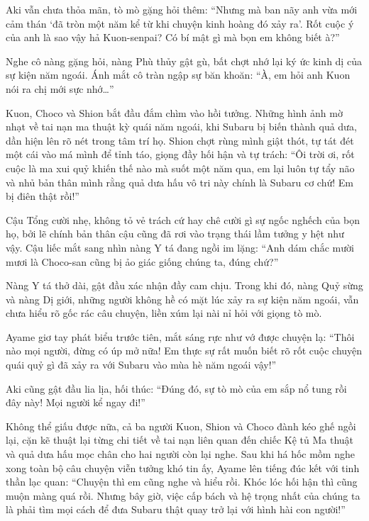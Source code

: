 \documentclass[../main.tex]{subfiles}
\begin{document}
Aki vẫn chưa thỏa mãn, tò mò gặng hỏi thêm:
``Nhưng mà ban nãy anh vừa mới cảm thán `đã tròn một năm kể từ khi chuyện kinh hoàng đó xảy ra'. Rốt cuộc ý của anh là sao vậy hả Kuon-senpai? Có bí mật gì mà bọn em không biết à?''

Nghe cô nàng gặng hỏi, nàng Phù thủy gật gù, bất chợt nhớ lại ký ức kinh dị của sự kiện năm ngoái. Ánh mắt cô tràn ngập sự băn khoăn:
``À, em hỏi anh Kuon nói ra chị mới sực nhớ\dots''

Kuon, Choco và Shion bắt đầu đắm chìm vào hồi tưởng. Những hình ảnh mờ nhạt về tai nạn ma thuật kỳ quái năm ngoái, khi Subaru bị biến thành quả dưa, dần hiện lên rõ nét trong tâm trí họ. Shion chợt rùng mình giật thót, tự tát đét một cái vào má mình để tỉnh táo, giọng đầy hối hận và tự trách:
``Ôi trời ơi, rốt cuộc là ma xui quỷ khiến thế nào mà suốt một năm qua, em lại luôn tự tẩy não và nhủ bản thân mình rằng quả dưa hấu vô tri này chính là Subaru cơ chứ! Em bị điên thật rồi!''

Cậu Tổng cười nhẹ, không tỏ vẻ trách cứ hay chê cười gì sự ngốc nghếch của bọn họ, bởi lẽ chính bản thân cậu cũng đã rơi vào trạng thái lầm tưởng y hệt như vậy. Cậu liếc mắt sang nhìn nàng Y tá đang ngồi im lặng:
``Anh dám chắc mười mươi là Choco-san cũng bị ảo giác giống chúng ta, đúng chứ?''

Nàng Y tá thở dài, gật đầu xác nhận đầy cam chịu. Trong khi đó, nàng Quỷ sừng và nàng Dị giới, những người không hề có mặt lúc xảy ra sự kiện năm ngoái, vẫn chưa hiểu rõ gốc rác câu chuyện, liền xúm lại nài nỉ hỏi với giọng tò mò.


Ayame giơ tay phát biểu trước tiên, mắt sáng rực như vớ được chuyện lạ:
``Thôi nào mọi người, đừng có úp mở nữa! Em thực sự rất muốn biết rõ rốt cuộc chuyện quái quỷ gì đã xảy ra với Subaru vào mùa hè năm ngoái vậy!''

Aki cũng gật đầu lia lịa, hối thúc:
``Đúng đó, sự tò mò của em sắp nổ tung rồi đây này! Mọi người kể ngay đi!''

Không thể giấu được nữa, cả ba người Kuon, Shion và Choco đành kéo ghế ngồi lại, cặn kẽ thuật lại từng chi tiết về tai nạn liên quan đến chiếc Kệ tủ Ma thuật và quả dưa hấu mọc chân cho hai người còn lại nghe. Sau khi há hốc mồm nghe xong toàn bộ câu chuyện viễn tưởng khó tin ấy, Ayame lên tiếng đúc kết với tinh thần lạc quan:
``Chuyện thì em cũng nghe và hiểu rồi. Khóc lóc hối hận thì cũng muộn màng quá rồi. Nhưng bây giờ, việc cấp bách và hệ trọng nhất của chúng ta là phải tìm mọi cách để đưa Subaru thật quay trở lại với hình hài con người!''
\end{document}
